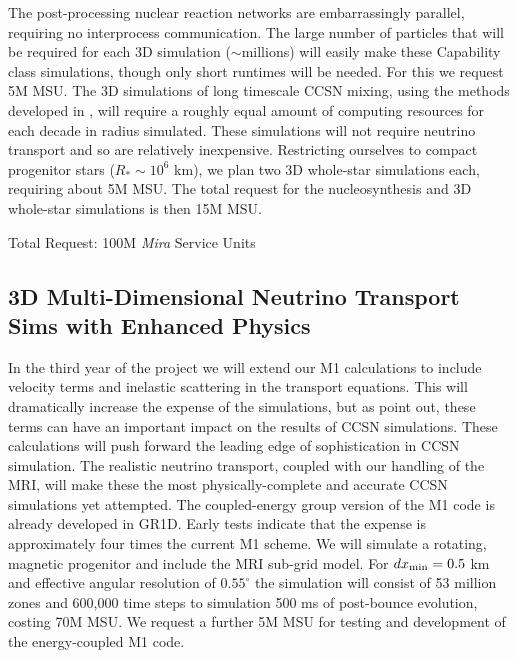 The post-processing nuclear reaction networks are embarrassingly parallel, requiring no interprocess communication. 
The large number of particles that will be required for each 3D simulation ($\sim$millions) will easily make these Capability class simulations, though only short runtimes will be needed.  
For this we request 5M MSU.
The 3D simulations of long timescale CCSN mixing, using the methods developed in \citet{Couch:2011cf}, will require a roughly equal amount of computing resources for each decade in radius simulated.
These simulations will not require neutrino transport and so are relatively inexpensive.
Restricting ourselves to compact progenitor stars ($R_* \sim 10^{6}$ km), we plan two 3D whole-star simulations each, requiring about 5M MSU.  The total request for the nucleosynthesis and 3D whole-star simulations is then 15M MSU.

\vspace{0.1in}  Total Request: 100M {\it Mira} Service Units\vspace{-0.1in}

\subsection{3D Multi-Dimensional Neutrino Transport Sims with Enhanced Physics}
\label{sec:enhancedM1}

In the third year of the project we will extend our M1 calculations to include velocity terms and inelastic scattering in the transport equations.  
This will dramatically increase the expense of the simulations, but as \citet{Lentz:2012fy} point out, these terms can have an important impact on the results of CCSN simulations.  
These calculations will push forward the leading edge of sophistication in CCSN simulation.  
The realistic neutrino transport, coupled with our handling of the MRI, will make these the most physically-complete and accurate CCSN simulations yet attempted.  
The coupled-energy group version of the M1 code is already developed in GR1D.  
Early tests indicate that the expense is approximately four times the current M1 scheme.
We will simulate a rotating, magnetic progenitor and include the MRI sub-grid model.  
For $dx_{\rm min} = 0.5$ km and effective angular resolution of $0.55^\circ$ the simulation will consist of 53 million zones and 600,000 time steps to simulation 500 ms of post-bounce evolution, costing 70M MSU.  
We request a further 5M MSU for testing and development of the energy-coupled M1 code.

